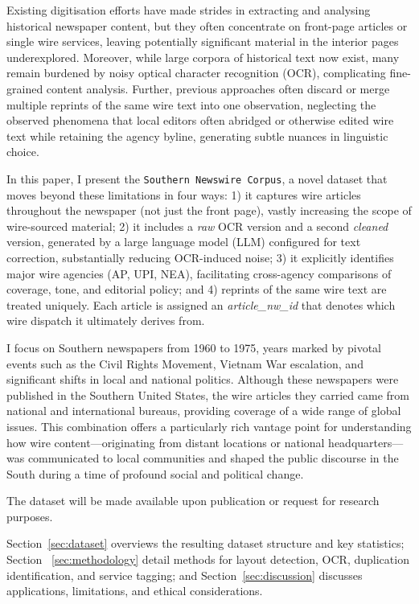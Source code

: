 \documentclass{article}
\begin{document}
Existing digitisation efforts have made strides in extracting and analysing historical newspaper content, but they often concentrate on front-page articles or single wire services, leaving potentially significant material in the interior pages underexplored. Moreover, while large corpora of historical text now exist, many remain burdened by noisy optical character recognition (OCR), complicating fine-grained content analysis. Further, previous approaches often discard or merge multiple reprints of the same wire text into one observation, neglecting the observed phenomena that local editors often abridged or otherwise edited wire text while retaining the agency byline, generating subtle nuances in linguistic choice. 

In this paper, I present the \texttt{Southern Newswire Corpus}, a novel dataset that moves beyond these limitations in four ways: 1) it captures wire articles throughout the newspaper (not just the front page), vastly increasing the scope of wire-sourced material; 2) it includes a \emph{raw} OCR version and a second \emph{cleaned} version, generated by a large language model (LLM) configured for text correction, substantially reducing OCR-induced noise; 3) it explicitly identifies major wire agencies (AP, UPI, NEA), facilitating cross-agency comparisons of coverage, tone, and editorial policy; and 4) reprints of the same wire text are treated uniquely. Each article is assigned an \textit{article\_nw\_id} that denotes which wire dispatch it ultimately derives from. 

I focus on Southern newspapers from 1960 to 1975, years marked by pivotal events such as the Civil Rights Movement, Vietnam War escalation, and significant shifts in local and national politics. Although these newspapers were published in the Southern United States, the wire articles they carried came from national and international bureaus, providing coverage of a wide range of global issues. This combination offers a particularly rich vantage point for understanding how wire content—originating from distant locations or national headquarters—was communicated to local communities and shaped the public discourse in the South during a time of profound social and political change.

The dataset will be made available upon publication or request for research purposes.

Section~\ref{sec:dataset} overviews the resulting dataset structure and key statistics; Section ~\ref{sec:methodology} detail methods for layout detection, OCR, duplication identification, and service tagging; and Section~\ref{sec:discussion} discusses applications, limitations, and ethical considerations.
\end{document}
